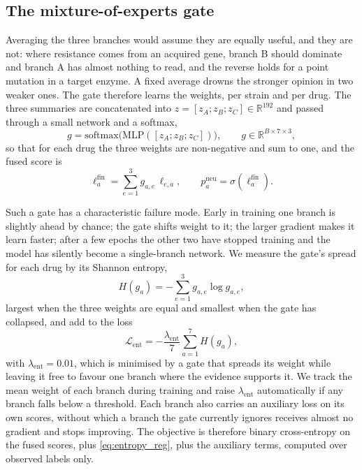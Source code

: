 \documentclass[11pt]{article}
\begin{document}
\subsection{The mixture-of-experts gate}
Averaging the three branches would assume they are equally useful, and they are not: where
resistance comes from an acquired gene, branch B should dominate and branch A has almost nothing to
read, and the reverse holds for a point mutation in a target enzyme. A fixed average drowns the
stronger opinion in two weaker ones. The gate \cite{jacobs1991moe,shazeer2017moe} therefore learns
the weights, per strain and per drug. The three summaries are concatenated into
$z = [z_A; z_B; z_C] \in \mathbb{R}^{192}$ and passed through a small network and a softmax,
\begin{equation}
g = \mathrm{softmax}\big(\mathrm{MLP}([z_A; z_B; z_C])\big), \qquad g \in \mathbb{R}^{B \times 7 \times 3},
\label{eq:moe_gate}
\end{equation}
so that for each drug the three weights are non-negative and sum to one, and the fused score is
\begin{equation}
\ell^{\mathrm{fin}}_{a} = \sum_{e=1}^{3} g_{a,e}\,\ell_{e,a},
\qquad
p^{\mathrm{neu}}_{a} = \sigma\!\left(\ell^{\mathrm{fin}}_{a}\right).
\label{eq:fusion}
\end{equation}

Such a gate has a characteristic failure mode. Early in training one branch is slightly ahead by
chance; the gate shifts weight to it; the larger gradient makes it learn faster; after a few epochs
the other two have stopped training and the model has silently become a single-branch network. We
measure the gate's spread for each drug by its Shannon entropy,
\begin{equation}
H(g_a) = -\sum_{e=1}^{3} g_{a,e} \log g_{a,e},
\label{eq:gate_entropy}
\end{equation}
largest when the three weights are equal and smallest when the gate has collapsed, and add to the
loss
\begin{equation}
\mathcal{L}_{\mathrm{ent}}
  = -\frac{\lambda_{\mathrm{ent}}}{7} \sum_{a=1}^{7} H(g_a),
\label{eq:entropy_reg}
\end{equation}
with $\lambda_{\mathrm{ent}} = 0.01$, which is minimised by a gate that spreads its weight while
leaving it free to favour one branch where the evidence supports it. We track the mean weight of
each branch during training and raise $\lambda_{\mathrm{ent}}$ automatically if any branch falls
below a threshold. Each branch also carries an auxiliary loss on its own scores, without which a
branch the gate currently ignores receives almost no gradient and stops improving. The objective is
therefore binary cross-entropy on the fused scores, plus \eqref{eq:entropy_reg}, plus the auxiliary
terms, computed over observed labels only.
\end{document}
